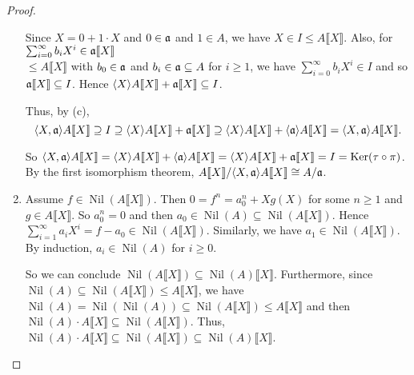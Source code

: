 \begin{proof}
\begin{enumerate}
            Since $X = 0 + 1 \cdot X$ and $0 \in \mathfrak{a}$ and $1\in A$, we have $X \in I \leq A\llbracket X \rrbracket$. Also, for $\sum_{i=0}^\infty b_iX^i \in \mathfrak{a} \llbracket X \rrbracket$ \\
            $\leq A \llbracket X \rrbracket$ with $b_0 \in \mathfrak{a}$ and $b_i \in \mathfrak{a} \subseteq A$ for $i \geq 1$, we have $\sum_{i=0}^\infty b_iX^i \in I$ and so $\mathfrak{a} \llbracket X \rrbracket \subseteq I$. Hence $\langle X \rangle A\llbracket X \rrbracket + \mathfrak{a}\llbracket X \rrbracket \subseteq I$. \par
            Thus, by (c),
            \[\langle X,\mathfrak{a} \rangle A\llbracket X \rrbracket \supseteq I \supseteq \langle X \rangle A\llbracket X \rrbracket + \mathfrak{a} \llbracket X \rrbracket \supseteq \langle X \rangle A\llbracket X \rrbracket + \langle \mathfrak{a} \rangle A\llbracket X \rrbracket = \langle X,\mathfrak{a} \rangle A\llbracket X \rrbracket.\] 
            \par So $\langle X,\mathfrak{a} \rangle A\llbracket X \rrbracket = \langle X \rangle A \llbracket X \rrbracket + \langle \mathfrak{a} \rangle A\llbracket X \rrbracket = \langle X \rangle A\llbracket X \rrbracket + \mathfrak{a} \llbracket X \rrbracket = I = \operatorname{Ker}(\tau \circ \pi)$. By the first isomorphism theorem, $A\llbracket X \rrbracket / \langle X,\mathfrak{a} \rangle A \llbracket X \rrbracket \cong A/\mathfrak{a}$. 
        \item 
            Assume $f \in \operatorname{Nil}(A\llbracket X \rrbracket)$. Then $0 = f^n = a_0^n + Xg(X)$ for some $n \geq 1$ and $g \in A\llbracket X \rrbracket$. So $a_0^n = 0$ and then $a_0 \in \operatorname{Nil}(A) \subseteq \operatorname{Nil}(A\llbracket X \rrbracket)$. Hence $\sum_{i=1}^\infty a_iX^i = f-a_0 \in \operatorname{Nil}(A \llbracket X \rrbracket)$. Similarly, we have $a_1 \in \operatorname{Nil}(A\llbracket X \rrbracket)$. By induction, $a_i \in \operatorname{Nil}(A)$ for $i \geq 0$. \par 
            So we can conclude $\operatorname{Nil}(A\llbracket X \rrbracket) \subseteq \operatorname{Nil}(A)\llbracket X \rrbracket$. Furthermore, since $\operatorname{Nil}(A) \subseteq \operatorname{Nil}(A\llbracket X \rrbracket) \leq A \llbracket X \rrbracket$, we have $\operatorname{Nil}(A) = \operatorname{Nil}(\operatorname{Nil}(A)) \subseteq \operatorname{Nil}(A\llbracket X \rrbracket) \leq A\llbracket X \rrbracket$ and then $\operatorname{Nil}(A) \cdot A\llbracket X \rrbracket \subseteq \operatorname{Nil}(A\llbracket X \rrbracket)$. Thus, $\operatorname{Nil}(A) \cdot A\llbracket X \rrbracket \subseteq \operatorname{Nil}(A\llbracket X \rrbracket) \subseteq \operatorname{Nil}(A)\llbracket X \rrbracket$. \par 

\end{enumerate}
\end{proof}
